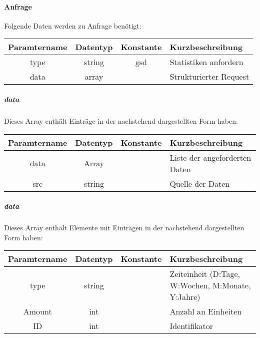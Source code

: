\paragraph{Anfrage}Folgende Daten werden zu Anfrage benötigt:
\begin{table}[H]
	\begin{tabular}{|c|c|c|p{6.5cm}|}
		\hline
		\textbf{Paramtername} & \textbf{Datentyp} & \textbf{Konstante} & \textbf{Kurzbeschreibung}                                                                                               \\ \hline
		type                & string            & gsd                & Statistiken anfordern \\ \hline
		data                & array             &                    & Strukturierter Request \\ \hline
	\end{tabular}
\end{table}
\subparagraph{data}Dieses Array enthält Einträge in der nachstehend dargestellten Form haben:
\begin{table}[H]
	\begin{tabular}{|c|c|c|p{6.5cm}|}
		\hline
		\textbf{Paramtername} & \textbf{Datentyp} & \textbf{Konstante} & \textbf{Kurzbeschreibung}    \\ \hline
		data               & Array             &                 & Liste der angeforderten Daten \\ \hline
		src                & string            &                 & Quelle der Daten \\ \hline
	\end{tabular}
\end{table}
\subparagraph{data}Dieses Array enthält Elemente mit Einträgen in der nachstehend dargestellten Form haben:
\begin{table}[H]
	\begin{tabular}{|c|c|c|p{6.5cm}|}
		\hline
		\textbf{Paramtername} & \textbf{Datentyp} & \textbf{Konstante} & \textbf{Kurzbeschreibung}    \\ \hline
		type               & string            &                 & Zeiteinheit (D:Tage, W:Wochen, M:Monate, Y:Jahre) \\ \hline
		Amount             & int               &                 & Anzahl an Einheiten \\ \hline
		ID                 & int               &                 & Identifikator \\ \hline
	\end{tabular}
\end{table}
